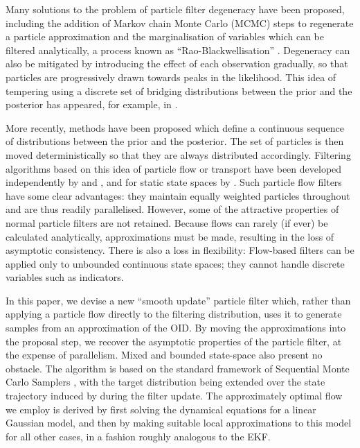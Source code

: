 \documentclass[a4paper,10pt]{article}
\begin{document}
Many solutions to the problem of particle filter degeneracy have been proposed, including the addition of Markov chain Monte Carlo (MCMC) steps to regenerate a particle approximation \cite{Gilks2001} and the marginalisation of variables which can be filtered analytically, a process known as ``Rao-Blackwellisation'' \cite{Casella1996,Doucet2000}. Degeneracy can also be mitigated by introducing the effect of each observation gradually, so that particles are progressively drawn towards peaks in the likelihood. This idea of tempering using a discrete set of bridging distributions between the prior and the posterior has appeared, for example, in \cite{Godsill2001b}.

More recently, methods have been proposed which define a continuous sequence of distributions between the prior and the posterior. The set of particles is then moved deterministically so that they are always distributed accordingly. Filtering algorithms based on this idea of particle flow or transport have been developed independently by \cite{Daum2008,Daum2011d} and \cite{Reich2011}, and for static state spaces by \cite{Moselhy2012}. Such particle flow filters have some clear advantages: they maintain equally weighted particles throughout and are thus readily parallelised. However, some of the attractive properties of normal particle filters are not retained. Because flows can rarely (if ever) be calculated analytically, approximations must be made, resulting in the loss of asymptotic consistency. There is also a loss in flexibility: Flow-based filters can be applied only to unbounded continuous state spaces; they cannot handle discrete variables such as indicators.

In this paper, we devise a new ``smooth update'' particle filter which, rather than applying a particle flow directly to the filtering distribution, uses it to generate samples from an approximation of the OID. By moving the approximations into the proposal step, we recover the asymptotic properties of the particle filter, at the expense of parallelism. Mixed and bounded state-space also present no obstacle. The algorithm is based on the standard framework of Sequential Monte Carlo Samplers \cite{DelMoral2006}, with the target distribution being extended over the state trajectory induced by during the filter update. The approximately optimal flow we employ is derived by first solving the dynamical equations for a linear Gaussian model, and then by making suitable local approximations to this model for all other cases, in a fashion roughly analogous to the EKF.
\end{document}
